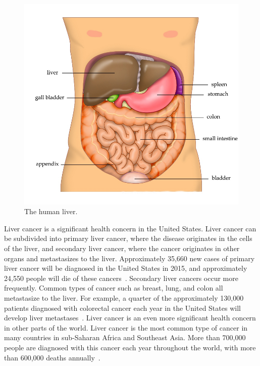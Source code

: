 \begin{figure}[!ht]
\centering
\includegraphics[width = 0.75\columnwidth]{./Images/Chapter1/liverIllustration.jpg}%
\caption{The human liver.}
\label{fig:Ch1LiverAnatomy}
\end{figure}    

Liver cancer is a significant health concern in the United States. Liver cancer can be subdivided into primary liver cancer, where the disease originates in the cells of the liver, and secondary liver cancer, where the cancer originates in other organs and metastasizes to the liver. Approximately 35,660 new cases of primary liver cancer will be diagnosed in the United States in 2015, and approximately 24,550 people will die of these cancers~\cite{AmericanCancer2015}. Secondary liver cancers occur more frequently. Common types of cancer such as breast, lung, and colon all metastasize to the liver. For example, a quarter of the approximately 130,000 patients diagnosed with colorectal cancer each year in the United States will develop liver metastases~\cite{Ananthakrishnan2006,CDC2015,Haddad2011}. Liver cancer is an even more significant health concern in other parts of the world. Liver cancer is the most common type of cancer in many countries in sub-Saharan Africa and Southeast Asia. More than 700,000 people are diagnosed with this cancer each year throughout the world, with more than 600,000 deaths annually~\cite{AmericanCancer2015}.

